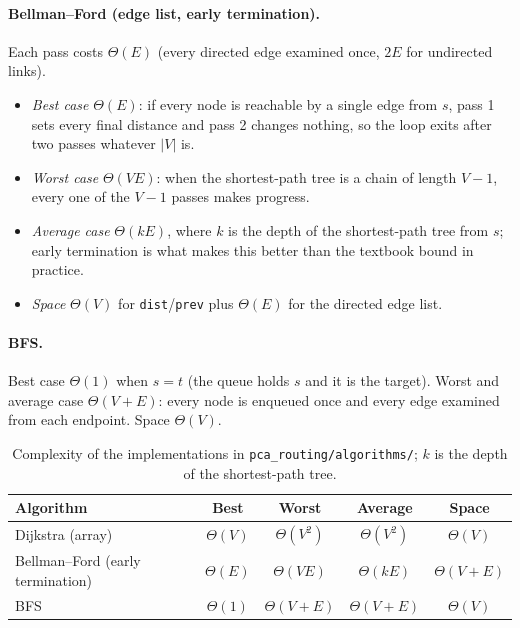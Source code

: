 \documentclass[11pt,a4paper]{article}
\begin{document}
\paragraph{Bellman--Ford (edge list, early termination).}
Each pass costs $\Theta(E)$ (every directed edge examined once, $2E$ for undirected links).
\begin{itemize}
  \item \emph{Best case} $\Theta(E)$: if every node is reachable by a single edge from $s$,
        pass 1 sets every final distance and pass 2 changes nothing, so the loop exits after
        two passes whatever $|V|$ is.
  \item \emph{Worst case} $\Theta(VE)$: when the shortest-path tree is a chain of length
        $V-1$, every one of the $V-1$ passes makes progress.
  \item \emph{Average case} $\Theta(kE)$, where $k$ is the depth of the shortest-path tree
        from $s$; early termination is what makes this better than the textbook bound in
        practice.
  \item \emph{Space} $\Theta(V)$ for \texttt{dist}/\texttt{prev} plus $\Theta(E)$ for the
        directed edge list.
\end{itemize}

\paragraph{BFS.}
Best case $\Theta(1)$ when $s=t$ (the queue holds $s$ and it is the target). Worst and average
case $\Theta(V+E)$: every node is enqueued once and every edge examined from each endpoint.
Space $\Theta(V)$.

\begin{table}[htbp]
\centering
\begin{tabular}{lcccc}
\toprule
Algorithm & Best & Worst & Average & Space \\
\midrule
Dijkstra (array) & $\Theta(V)$ & $\Theta(V^2)$ & $\Theta(V^2)$ & $\Theta(V)$ \\
Bellman--Ford (early termination) & $\Theta(E)$ & $\Theta(VE)$ & $\Theta(kE)$ & $\Theta(V+E)$ \\
BFS & $\Theta(1)$ & $\Theta(V+E)$ & $\Theta(V+E)$ & $\Theta(V)$ \\
\bottomrule
\end{tabular}
\caption{Complexity of the implementations in \texttt{pca\_routing/algorithms/}; $k$ is the depth of the shortest-path tree.}
\label{tab:complexity}
\end{table}
\end{document}
